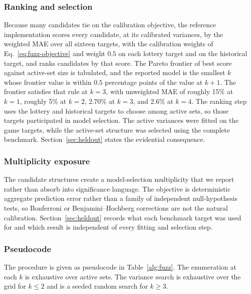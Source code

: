 \documentclass[journal]{IEEEtran}
\begin{document}
\subsubsection{Ranking and selection}
Because many candidates tie on the calibration objective, the reference implementation scores every candidate, at its calibrated variances, by the weighted MAE over all sixteen targets, with the calibration weights of Eq.~\eqref{eq:fuzz-objective} and weight $0.5$ on each lottery target and on the historical target, and ranks candidates by that score.
The Pareto frontier of best score against active-set size is tabulated, and the reported model is the smallest $k$ whose frontier value is within $0.5$ percentage points of the value at $k+1$.
The frontier satisfies that rule at $k=3$, with unweighted MAE of roughly 15\% at $k=1$, roughly 5\% at $k=2$, 2.70\% at $k=3$, and 2.6\% at $k=4$.
The ranking step uses the lottery and historical targets to choose among active sets, so those targets participated in model selection.
The active variances were fitted on the game targets, while the active-set structure was selected using the complete benchmark.
Section~\ref{sec:heldout} states the evidential consequence.

\subsubsection{Multiplicity exposure}
The candidate structures create a model-selection multiplicity that we report rather than absorb into significance language.
The objective is deterministic aggregate prediction error rather than a family of independent null-hypothesis tests, so Bonferroni or Benjamini--Hochberg corrections are not the natural calibration.
Section~\ref{sec:heldout} records what each benchmark target was used for and which result is independent of every fitting and selection step.

\subsubsection{Pseudocode}
The procedure is given as pseudocode in Table~\ref{alg:fuzz}.
The enumeration at each $k$ is exhaustive over active sets.
The variance search is exhaustive over the grid for $k\le2$ and is a seeded random search for $k\ge3$.
\end{document}
